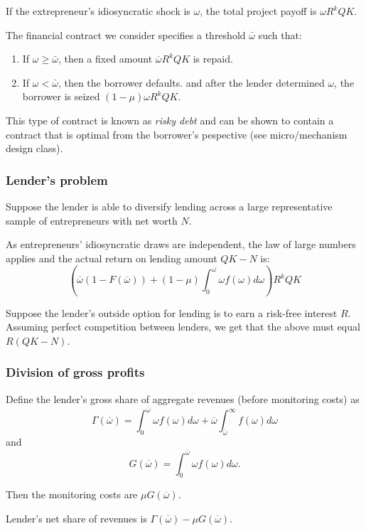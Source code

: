 If the extrepreneur's idiosyncratic shock is $\omega $, the total project payoff is $\omega R^{k}QK$.

The financial contract we consider specifies a threshold $\bar{\omega }$ such that:
\begin{enumerate}
    \item If $\omega \geq \bar{\omega }$, then a fixed amount $\overline{\omega}R^k QK$ is repaid.
    \item If $\omega < \bar{\omega }$, then the borrower defaults. and after the lender determined $\omega $,
    the borrower is seized $(1-\mu) \omega R^k QK$.
\end{enumerate}

This type of contract is known as \textit{risky debt} and can be shown
to contain a contract that is optimal from the borrower’s
pespective (see micro/mechanism design class).

\subsubsection{Lender's problem}
Suppose the lender is able to diversify lending across a large
representative sample of entrepreneurs with net worth $N$.

As entrepreneurs’ idiosyncratic draws are independent, the law
of large numbers applies and the actual return on lending
amount $QK-N$ is:
\[\left(\overline{\omega}(1-F(\overline{\omega})) + (1-\mu) \int_{0}^{\overline{\omega}} \omega f(\omega) d \omega\right)R^k QK\]

Suppose the lender’s outside option for lending is to earn a
risk-free interest $R$. Assuming perfect competition between
lenders, we get that the above must equal $R(QK-N)$.

\subsubsection{Division of gross profits}
Define the lender’s gross share of aggregate revenues (before
monitoring costs) as
\[
\Gamma(\overline{\omega}) = \int_{0}^{\overline{\omega}} \omega f(\omega) d \omega + \overline{\omega} \int_{\overline{\omega}}^{\infty} f(\omega) d \omega
\]
and
\[G(\overline{\omega} ) = \int_{0}^{\overline{\omega} } \omega f(\omega) d \omega. \]

Then the monitoring costs are $\mu G(\overline{\omega}).$

Lender's net share of revenues is $\Gamma(\overline{\omega}) - \mu G(\overline{\omega})$.

